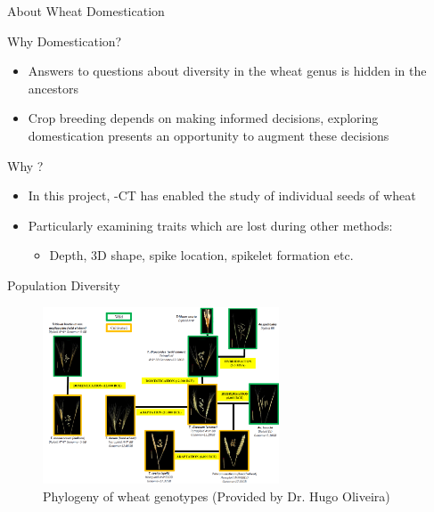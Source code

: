 \documentclass[t, aspectratio=169]{beamer}
\begin{document}
\begin{frame}[label={sec:org1bb146c}]{About Wheat Domestication}
\begin{block}{Why Domestication?}
\begin{itemize}
\item Answers to questions about diversity in the wheat genus is hidden in the ancestors \cite{Cockram2007}
\item Crop breeding depends on making informed decisions, exploring domestication presents an opportunity to augment these decisions
\end{itemize}
\end{block}

\begin{block}{Why \microCT?}
\begin{itemize}
\item In this project, \textmu{}-CT has enabled the study of individual seeds of wheat
\item Particularly examining traits which are lost during other methods:
\begin{itemize}
\item Depth, 3D shape, spike location, spikelet formation etc.
\end{itemize}
\end{itemize}
\end{block}
\end{frame}


\begin{frame}[label={sec:org7683a98}]{Population Diversity}
\begin{figure}[htbp]
\centering
\includegraphics[width=7cm]{./images/philotree.png}
\caption{\label{fig:orgb585cef}
Phylogeny of wheat genotypes (Provided by Dr. Hugo Oliveira)}
\end{figure}
\end{frame}
\end{document}
